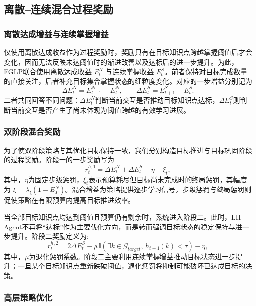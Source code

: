 \documentclass[11pt,a4paper]{article}
\begin{document}
\subsection{离散--连续混合过程奖励}

\subsubsection{离散达成增益与连续掌握增益}

仅使用离散达成收益作为过程奖励时，奖励只有在目标知识点跨越掌握阈值后才会变化，因而无法反映未达阈值时的渐进改善以及达标后的进一步提升。为此，FGLP联合使用离散达成收益 $E_t^{N}$ 与连续掌握收益 $E_t^{S}$。前者保持对目标完成数量的直接关注，后者补充目标集合掌握状态的细粒度变化。对应的一步增益分别记为
\begin{equation}
\Delta E_t^{N}=E_{t+1}^{N}-E_t^{N},
\qquad
\Delta E_t^{S}=E_{t+1}^{S}-E_t^{S}.
\end{equation}
二者共同回答不同问题：$\Delta E_t^{N}$判断当前交互是否推动目标知识点达标，$\Delta E_t^{S}$则判断当前交互是否产生了尚未体现为阈值跨越的有效学习进展。

\subsubsection{双阶段混合奖励}

为了使双阶段策略与其优化目标保持一致，我们分别构造目标推进与目标巩固阶段的过程奖励。阶段一的一步奖励写为
\begin{equation}
r_t^{h,1}
=
\Delta E_t^{N}
+
\Delta E_t^{S}
-
\eta
-
\xi_t,
\end{equation}
其中，$\eta$为固定步级惩罚，$\xi_t$表示预算耗尽但目标尚未完成时的终局惩罚，其幅度为 $\xi=\lambda_{\xi}(1-E_T^{N})$。混合增益为策略提供逐步学习信号，步级惩罚与终局惩罚则促使策略在有限预算内提高目标推进效率。

当全部目标知识点均达到阈值且预算仍有剩余时，系统进入阶段二。此时，LH-Agent不再将“达标”作为主要优化方向，而是转而强调目标状态的稳定保持与进一步提升。阶段二奖励定义为:
\begin{equation}
r_t^{h,2}=2\Delta E_t^{S}-
\mu\,\mathbb{I}\!\left(\exists k\in\mathcal{G}_{target},\,h_{t+1}(k)<\tau\right)
-
\eta,
\end{equation}
其中，$\mu$为退化惩罚系数。阶段二主要利用连续掌握增益推动目标状态进一步提升；一旦某个目标知识点重新跌破阈值，退化惩罚将抑制可能破坏已达成目标的决策。

\subsubsection{高层策略优化}
\end{document}
